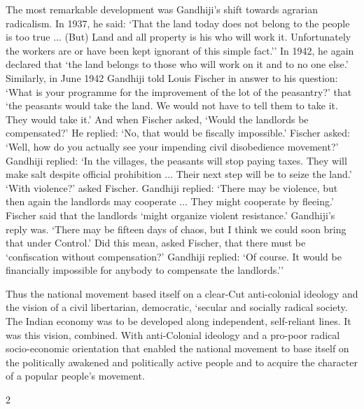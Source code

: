 \begin{multicols}{2}
The most remarkable development was Gandhiji's shift towards agrarian radicalism. In 1937, he said: `That the land today does not belong to the people is too true ... (But) Land and all property is his who will work it. Unfortunately the workers are or have been kept ignorant of this simple fact.'' In 1942, he again declared that `the land belongs to those who will work on it and to no one else.' Similarly, in June 1942 Gandhiji told Louis Fischer in answer to his question: `What is your programme for the improvement of the lot of the peasantry?' that `the peasants would take the land. We would not have to tell them to take it. They would take it.' And when Fischer asked, `Would the landlords be compensated?' He replied: `No, that would be fiscally impossible.' Fischer asked: `Well, how do you actually see your impending civil disobedience movement?' Gandhiji replied: `In the villages, the peasants will stop paying taxes. They will make salt despite official prohibition ... Their next step will be to seize the land.' `With violence?' asked Fischer. Gandhiji replied: `There may be violence, but then again the landlords may cooperate ... They might cooperate by fleeing.' Fischer said that the landlords `might organize violent resistance.' Gandhiji's reply was. `There may be fifteen days of chaos, but I think we could soon bring that under Control.' Did this mean, asked Fischer, that there must be `confiscation without compensation?' Gandhiji replied: `Of course. It would be financially impossible for anybody to compensate the landlords.''

Thus the national movement based itself on a clear-Cut anti-colonial ideology and the vision of a civil libertarian, democratic, `secular and socially radical society. The Indian economy was to be developed along independent, self-reliant lines. It was this vision, combined. With anti-Colonial ideology and a pro-poor radical socio-economic orientation that enabled the national movement to base itself on the politically awakened and politically active people and to acquire the character of a popular people's movement.
\end{multicols}{2}
